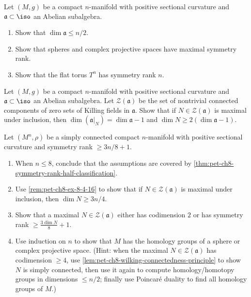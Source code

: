 \begin{remark}[Exercise 8.4.15]
  \label{rem:pet-ch8-ex-8-4-15}
  Let $(M,g)$ be a compact $n$-manifold with positive sectional curvature and
  $\mathfrak a\subset\iso$ an Abelian subalgebra.
  \begin{enumerate}
    \item Show that $\dim\mathfrak a\le n/2$.
    \item Show that spheres and complex projective spaces have maximal
      symmetry rank.
    \item Show that the flat torus $T^n$ has symmetry rank $n$.
  \end{enumerate}
\end{remark}

\begin{remark}[Exercise 8.4.16]
  \label{rem:pet-ch8-ex-8-4-16}
  Let $(M,g)$ be a compact $n$-manifold with positive sectional curvature and
  $\mathfrak a\subset\iso$ an Abelian subalgebra. Let $\mathcal Z(\mathfrak a)$
  be the set of nontrivial connected components of zero sets of Killing fields
  in $\mathfrak a$. Show that if $N\in\mathcal Z(\mathfrak a)$ is maximal under
  inclusion, then $\dim(\mathfrak a|_N)=\dim\mathfrak a-1$ and
  $\dim N\ge2(\dim\mathfrak a-1)$.
\end{remark}

\begin{remark}
  \label{rem:pet-ch8-ex-8-4-17}
  Let $(M^n,\rho)$ be a simply connected compact $n$-manifold with positive
  sectional curvature and symmetry rank $\ge3n/8+1$.
  \begin{enumerate}
    \item When $n\le8$, conclude that the assumptions are covered by
      \cref{thm:pet-ch8-symmetry-rank-half-classification}.
    \item Use \cref{rem:pet-ch8-ex-8-4-16} to show that if
      $N\in\mathcal Z(\mathfrak a)$ is maximal under inclusion, then
      $\dim N\ge3n/4$.
    \item Show that a maximal $N\in\mathcal Z(\mathfrak a)$ either has
      codimension $2$ or has symmetry rank $\ge\tfrac{3\dim N}8+1$.
    \item Use induction on $n$ to show that $M$ has the homology groups of a
      sphere or complex projective space. (Hint: when the maximal
      $N\in\mathcal Z(\mathfrak a)$ has codimension $\ge4$, use
      \cref{lem:pet-ch8-wilking-connectedness-principle} to show $N$ is simply
      connected, then use it again to compute homology/homotopy groups in
      dimensions $\le n/2$; finally use Poincar\'e duality to find all
      homology groups of $M$.)
  \end{enumerate}
\end{remark}

